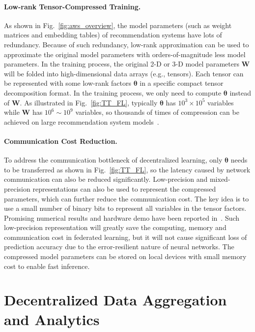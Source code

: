 \documentclass[11pt,letterpaper]{article}
\newcommand{\mat}[1]{\mathbf{#1}}
\begin{document}
\paragraph{Low-rank Tensor-Compressed Training.} As shown in Fig.~\ref{fig:aws_overview}, the model parameters (such as weight matrices and embedding tables) of recommendation systems have lots of redundancy. Because of such redundancy, low-rank approximation can be used to approximate the original model parameters with orders-of-magnitude less model parameters. In the training process, the original 2-D or 3-D model parameters $\mat{W}$ will be folded into high-dimensional data arrays (e.g., tensors). Each tensor can be represented with some low-rank factors $\boldsymbol{\theta}$ in a specific compact tensor decomposition format. In the training process, we only need to compute $\boldsymbol{\theta}$ instead of $\mat{W}$. As illustrated in Fig.~\ref{fig:TT_FL}, typically $\boldsymbol{\theta}$ has $10^3 \times 10^5$ variables while $\mat{W}$ has $10^6 \sim 10^9$ variables, so thousands of times of compression can be achieved on large recommendation system models~\cite{hawkins2022towards}. 

\paragraph{Communication Cost Reduction.} To address the communication bottleneck of decentralized learning, only $\boldsymbol{\theta}$ needs to be transferred as shown in Fig.~\ref{fig:TT_FL}, so the latency caused by network communication can also be reduced significantly. Low-precision and mixed-precision representations can also be used to represent the compressed parameters, which can further reduce the communication cost. The key idea is to use a small number of binary bits to represent all variables in the tensor factors. Promising numerical results and hardware demo have been reported in~\cite{yang2022hardware,zhang2021fpga}. Such low-precision representation will greatly save the computing, memory and communication cost in federated learning, but it will not cause significant loss of prediction accuracy due to the error-resilient nature of neural networks. The compressed model parameters can be stored on local devices with small memory cost to enable fast inference. 

\section{Decentralized Data Aggregation and Analytics}
\end{document}
